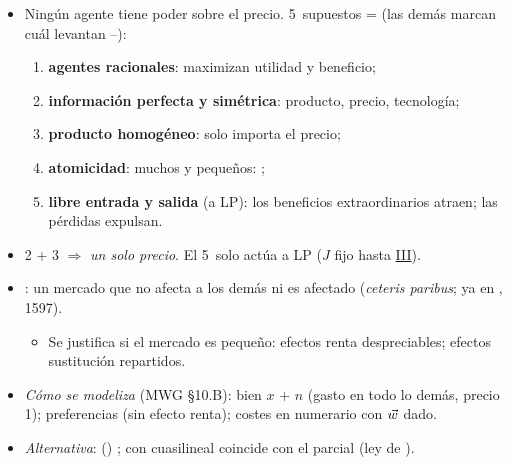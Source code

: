 \documentclass{article}
\begin{document}
\begin{columnas}
\begin{itemize}
\item Ningún agente tiene poder sobre el precio. 5~supuestos =  (las demás marcan cuál levantan --):
  \begin{enumerate}
  \item \textbf{agentes racionales}: maximizan utilidad y beneficio;
  \item \textbf{información perfecta y simétrica}: producto, precio, tecnología;
  \item \textbf{producto homogéneo}: solo importa el precio;
  \item \textbf{atomicidad}: muchos y pequeños: ;
  \item \textbf{libre entrada y salida} (a LP): los beneficios extraordinarios atraen; las pérdidas expulsan.
  \end{enumerate}
\item 2 + 3 $\Rightarrow$ \emph{un solo precio}. El 5~solo actúa a LP ($J$ fijo hasta \hyperref[rep:III]{III}).
\end{itemize}
\begin{itemize}
\item {}: un mercado que no afecta a los demás ni es afectado (\emph{ceteris paribus}; ya en , 1597).
  \begin{itemize}
  \item Se justifica si el mercado es pequeño: efectos renta despreciables; efectos sustitución repartidos.
  \end{itemize}
\item \emph{Cómo se modeliza} (MWG §10.B): bien $x$ +  $n$ (gasto en todo lo demás, precio 1); preferencias  (sin efecto renta); costes en numerario con $\vec{w}$ dado.
\item \emph{Alternativa}:  () ; con cuasilineal coincide con el parcial (ley de ).
\end{itemize}


\end{columnas}
\end{document}
